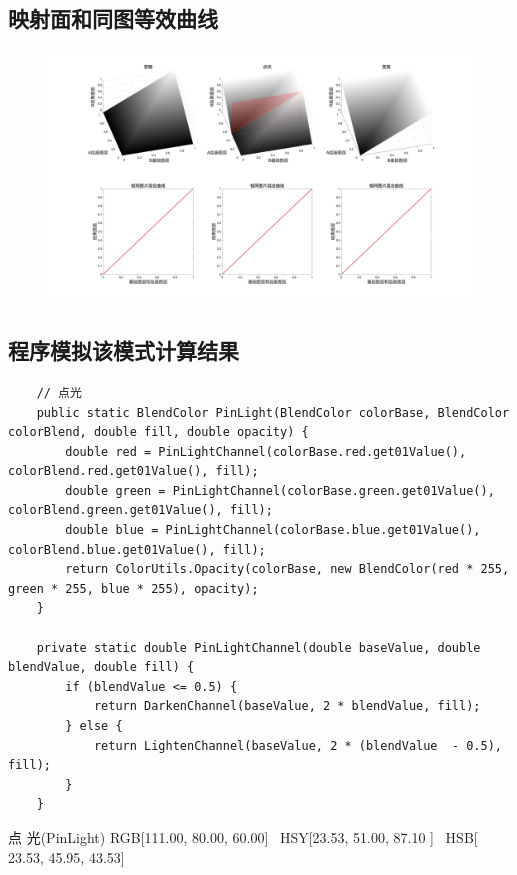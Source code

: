 \subsection{ 映射面和同图等效曲线}
\begin{figure}[h!]
	\centering
	\includegraphics[width=\linewidth]{figure/点光}
	\caption{}
	\label{fig:}
\end{figure}



\subsection{ 程序模拟该模式计算结果}

\begin{lstlisting}
	// 点光
	public static BlendColor PinLight(BlendColor colorBase, BlendColor colorBlend, double fill, double opacity) {
		double red = PinLightChannel(colorBase.red.get01Value(), colorBlend.red.get01Value(), fill);
		double green = PinLightChannel(colorBase.green.get01Value(), colorBlend.green.get01Value(), fill);
		double blue = PinLightChannel(colorBase.blue.get01Value(), colorBlend.blue.get01Value(), fill);
		return ColorUtils.Opacity(colorBase, new BlendColor(red * 255, green * 255, blue * 255), opacity);
	}
	
	private static double PinLightChannel(double baseValue, double blendValue, double fill) {
		if (blendValue <= 0.5) {
			return DarkenChannel(baseValue, 2 * blendValue, fill);
		} else {
			return LightenChannel(baseValue, 2 * (blendValue  - 0.5), fill);
		}
	}
\end{lstlisting}


\begin{result}
\item 点    光(PinLight)      RGB[111.00,  80.00,  60.00]~ HSY[23.53,  51.00,  87.10 ]~ HSB[ 23.53,  45.95,  43.53]
\end{result}


